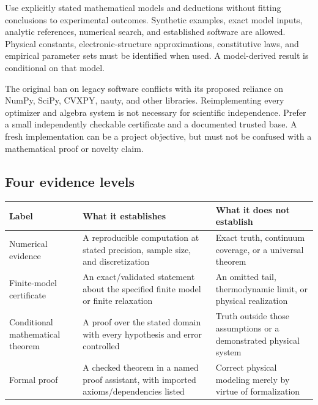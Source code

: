 \documentclass[
  11pt,
]{article}
\newcounter{none} %
\begin{document}
Use explicitly stated mathematical models and deductions without fitting
conclusions to experimental outcomes. Synthetic examples, exact model
inputs, analytic references, numerical search, and established software
are allowed. Physical constants, electronic-structure approximations,
constitutive laws, and empirical parameter sets must be identified when
used. A model-derived result is conditional on that model.

The original ban on legacy software conflicts with its proposed reliance
on NumPy, SciPy, CVXPY, nauty, and other libraries. Reimplementing every
optimizer and algebra system is not necessary for scientific
independence. Prefer a small independently checkable certificate and a
documented trusted base. A fresh implementation can be a project
objective, but must not be confused with a mathematical proof or novelty
claim.

\subsection{Four evidence levels}

{\def\LTcaptype{none} %
\begin{longtable}[]{@{}
  >{\raggedright\arraybackslash}p{}
  >{\raggedright\arraybackslash}p{}
  >{\raggedright\arraybackslash}p{}@{}}
\toprule\noalign{}
\begin{minipage}[b]{\linewidth}\raggedright
Label
\end{minipage} & \begin{minipage}[b]{\linewidth}\raggedright
What it establishes
\end{minipage} & \begin{minipage}[b]{\linewidth}\raggedright
What it does not establish
\end{minipage} \\
\midrule\noalign{}
\endhead
\bottomrule\noalign{}
\endlastfoot
Numerical evidence & A reproducible computation at stated precision,
sample size, and discretization & Exact truth, continuum coverage, or a
universal theorem \\
Finite-model certificate & An exact/validated statement about the
specified finite model or finite relaxation & An omitted tail,
thermodynamic limit, or physical realization \\
Conditional mathematical theorem & A proof over the stated domain with
every hypothesis and error controlled & Truth outside those assumptions
or a demonstrated physical system \\
Formal proof & A checked theorem in a named proof assistant, with
imported axioms/dependencies listed & Correct physical modeling merely
by virtue of formalization \\
\end{longtable}
}
\end{document}
